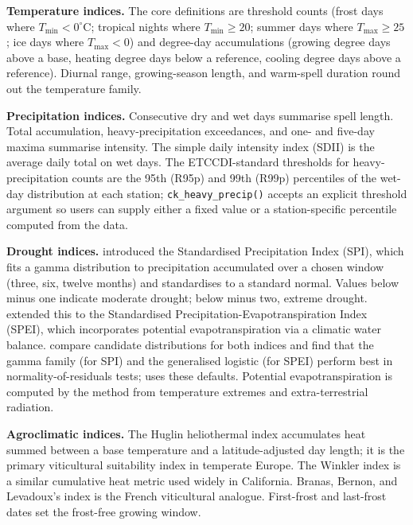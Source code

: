 \textbf{Temperature indices.} The core definitions are threshold counts
(frost days where \(T_{\min} < 0^\circ\)C; tropical nights where
\(T_{\min} \geq 20\); summer days where \(T_{\max} \geq 25\); ice days
where \(T_{\max} < 0\)) and degree-day accumulations (growing degree
days above a base, heating degree days below a reference, cooling
degree days above a reference). Diurnal range, growing-season
length, and warm-spell duration round out the temperature family.

\textbf{Precipitation indices.} Consecutive dry and wet days summarise
spell length. Total accumulation, heavy-precipitation exceedances,
and one- and five-day maxima summarise intensity. The simple daily
intensity index (SDII) is the average daily total on wet days. The
ETCCDI-standard thresholds for heavy-precipitation counts are the
95th (R95p) and 99th (R99p) percentiles of the wet-day
distribution at each station; \texttt{ck\_heavy\_precip()} accepts an
explicit threshold argument so users can supply either a fixed
value or a station-specific percentile computed from the data.

\textbf{Drought indices.} \citet{mckee1993relationship} introduced the
Standardised Precipitation Index (SPI), which fits a gamma
distribution to precipitation accumulated over a chosen window
(three, six, twelve months) and standardises to a standard normal.
Values below minus one indicate moderate drought; below minus
two, extreme drought. \citet{vicente2010multiscalar} extended this to
the Standardised Precipitation-Evapotranspiration Index (SPEI),
which incorporates potential evapotranspiration via a climatic
water balance. \citet{stagge2015candidate} compare candidate
distributions for both indices and find that the gamma family (for
SPI) and the generalised logistic (for SPEI) perform best in
normality-of-residuals tests;  uses these
defaults. Potential evapotranspiration is computed by the
\citet{hargreaves1985reference} method from temperature extremes and
extra-terrestrial radiation.

\textbf{Agroclimatic indices.} The Huglin heliothermal index
\citep{huglin1978nouveau} accumulates heat summed between a base
temperature and a latitude-adjusted day length; it is the primary
viticultural suitability index in temperate Europe. The Winkler
index \citep{winkler1974general} is a similar cumulative heat metric
used widely in California. Branas, Bernon, and Levadoux's index is
the French viticultural analogue. First-frost and last-frost dates
set the frost-free growing window.

